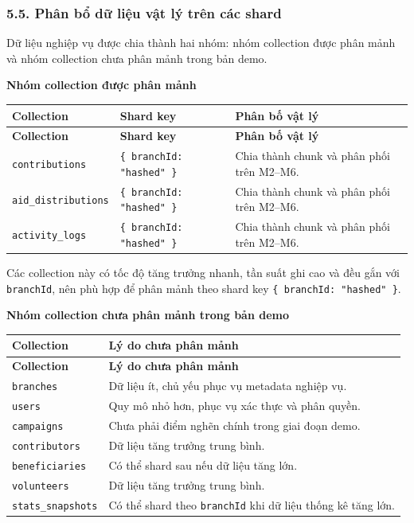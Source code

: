 \documentclass[12pt,a4paper]{article}
\begin{document}
\subsubsection*{5.5. Phân bổ dữ liệu vật lý trên các shard}

Dữ liệu nghiệp vụ được chia thành hai nhóm: nhóm collection được phân mảnh và nhóm collection chưa phân mảnh trong bản demo.

\textbf{Nhóm collection được phân mảnh}

\begin{center}
\small
\begin{longtable}{|p{3.4cm}|p{3.3cm}|p{4.8cm}|}
\hline
\textbf{Collection} & \textbf{Shard key} & \textbf{Phân bố vật lý} \\ \hline
\endfirsthead
\hline
\textbf{Collection} & \textbf{Shard key} & \textbf{Phân bố vật lý} \\ \hline
\endhead
\texttt{contributions} & \texttt{\{ branchId: "hashed" \}} & Chia thành chunk và phân phối trên M2--M6. \\ \hline
\texttt{aid\_distributions} & \texttt{\{ branchId: "hashed" \}} & Chia thành chunk và phân phối trên M2--M6. \\ \hline
\texttt{activity\_logs} & \texttt{\{ branchId: "hashed" \}} & Chia thành chunk và phân phối trên M2--M6. \\ \hline
\end{longtable}
\normalsize
\end{center}

Các collection này có tốc độ tăng trưởng nhanh, tần suất ghi cao và đều gắn với \texttt{branchId}, nên phù hợp để phân mảnh theo shard key \texttt{\{ branchId: "hashed" \}}.

\textbf{Nhóm collection chưa phân mảnh trong bản demo}

\begin{center}
\small
\begin{longtable}{|p{3.4cm}|p{8.3cm}|}
\hline
\textbf{Collection} & \textbf{Lý do chưa phân mảnh} \\ \hline
\endfirsthead
\hline
\textbf{Collection} & \textbf{Lý do chưa phân mảnh} \\ \hline
\endhead
\texttt{branches} & Dữ liệu ít, chủ yếu phục vụ metadata nghiệp vụ. \\ \hline
\texttt{users} & Quy mô nhỏ hơn, phục vụ xác thực và phân quyền. \\ \hline
\texttt{campaigns} & Chưa phải điểm nghẽn chính trong giai đoạn demo. \\ \hline
\texttt{contributors} & Dữ liệu tăng trưởng trung bình. \\ \hline
\texttt{beneficiaries} & Có thể shard sau nếu dữ liệu tăng lớn. \\ \hline
\texttt{volunteers} & Dữ liệu tăng trưởng trung bình. \\ \hline
\texttt{stats\_snapshots} & Có thể shard theo \texttt{branchId} khi dữ liệu thống kê tăng lớn. \\ \hline
\end{longtable}
\normalsize
\end{center}
\end{document}
